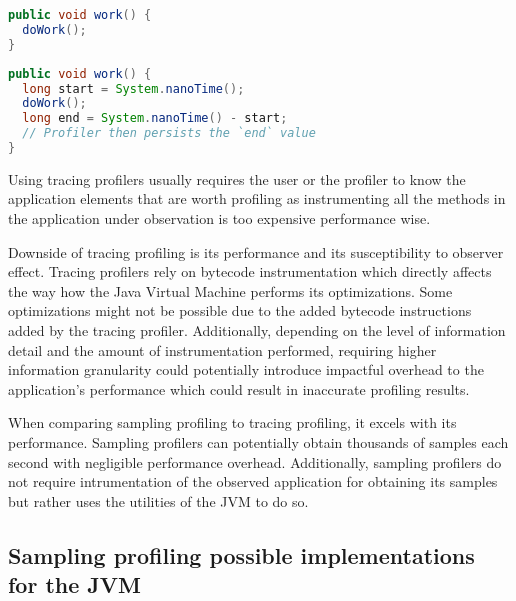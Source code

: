 \documentclass[..thesis.tex]{subfiles}
\begin{document}
\begin{minipage}[b]{.45\textwidth}
\begin{lstlisting}[language=java,style=def,label={lst:uninstrumented}, caption={Original source}]
public void work() {
  doWork();
}
\end{lstlisting}
\end{minipage}\hspace{12mm}
\begin{minipage}[b]{.45\textwidth}
\begin{lstlisting}[language=java,style=def,label={lst:instrumented}, caption={Instrumented source}]
public void work() {
  long start = System.nanoTime();
  doWork();
  long end = System.nanoTime() - start;
  // Profiler then persists the `end` value
}
\end{lstlisting}
\end{minipage}



Using tracing profilers usually requires the user or the profiler to know the application elements that are worth profiling as instrumenting all the methods in the application under observation is too expensive performance wise. 

Downside of tracing profiling is its performance and its susceptibility to observer effect. Tracing profilers rely on bytecode instrumentation which directly affects the way how the Java Virtual Machine performs its optimizations. Some optimizations might not be possible due to the added bytecode instructions added by the tracing profiler. Additionally, depending on the level of information detail and the amount of instrumentation performed, requiring higher information granularity could potentially introduce impactful overhead to the application's performance which could result in inaccurate profiling results. 

When comparing sampling profiling to tracing profiling, it excels with its performance. Sampling profilers can potentially obtain thousands of samples each second with negligible performance overhead. Additionally, sampling profilers do not require intrumentation of the observed application for obtaining its samples but rather uses the utilities of the JVM to do so.

\subsection{Sampling profiling possible implementations for the JVM}
\end{document}
